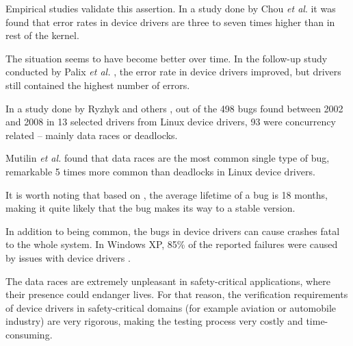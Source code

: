 \documentclass[..thesis.tex]{subfiles}
\begin{document}
Empirical studies validate this assertion. In a study done by Chou \textit{et al}. \cite{chou_empirical_2001} it was found that error rates in device drivers are three to seven times higher than in rest of the kernel. 

The situation seems to have become better over time. In the follow-up study conducted by Palix \textit{et al.} \cite{palix_faults_2011}, the error rate in device drivers improved, but drivers still contained the highest number of errors.

In a study done by Ryzhyk and others \cite{ryzhyk_dingo_2009}, out of the 498 bugs found between 2002 and 2008 in 13 selected drivers from Linux device drivers, 93 were concurrency related -- mainly data races or deadlocks. 

Mutilin \textit{et al.} \cite{mutilin_analysis_2012} found that data races are the most common single type of bug, remarkable 5 times more common than deadlocks in Linux device drivers.

It is worth noting that based on \cite{chou_empirical_2001,palix_faults_2011}, the average lifetime of a bug is 18 months, making it quite likely that the bug makes its way to a stable version. 


In addition to being common, the bugs in device drivers can cause crashes fatal to the whole system. In Windows XP, 85\% of the reported failures were caused by issues with device drivers \cite{swift_improving_2003}.

The data races are extremely unpleasant in safety-critical applications, where their presence could endanger lives. For that reason, the verification requirements of device drivers in safety-critical domains (for example aviation or automobile industry) are very rigorous, making the testing process very costly and time-consuming.






\end{document}
